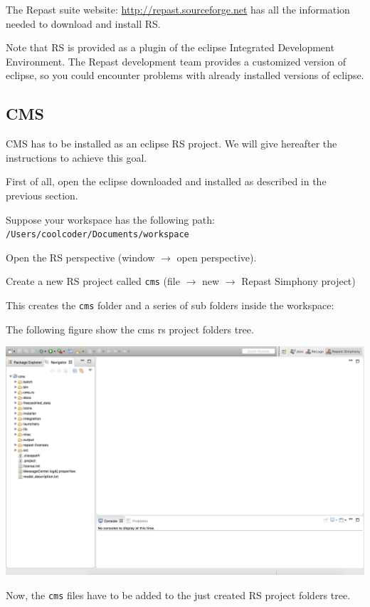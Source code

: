 \documentclass{article}
\begin{document}
The Repast suite website: \url{http://repast.sourceforge.net} has all the information needed to download and install RS.

Note that RS is provided as a plugin of the eclipse Integrated Development Environment. The Repast development team provides a customized version of eclipse, so you could encounter problems with already installed versions of eclipse. 

\subsection{CMS}

CMS has to be installed as an eclipse RS project. We will give hereafter the instructions to achieve this goal.

First of all, open the eclipse downloaded and installed as described in the previous section.

Suppose your workspace has the following path:\\
\verb+/Users/coolcoder/Documents/workspace+

Open the RS perspective (window $\rightarrow$ open perspective).

Create a new RS project called \verb+cms+ (file $\rightarrow$ new $\rightarrow$ Repast Simphony project)

This creates the \verb+cms+ folder and a series of sub folders inside the workspace:

The following figure show the cms rs project folders tree.

\vskip2mm
\noindent
\includegraphics[scale=0.35]{fig_cms_rs_navigation}

\vskip2mm
Now, the \verb+cms+ files have to be added to the just created RS project folders tree.
\end{document}
